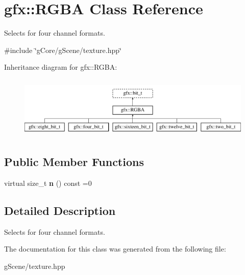 \hypertarget{classgfx_1_1RGBA}{\section{gfx\-:\-:R\-G\-B\-A Class Reference}
\label{classgfx_1_1RGBA}
}


Selects for four channel formats.  




{\ttfamily \#include \char`\"{}g\-Core/g\-Scene/texture.\-hpp\char`\"{}}

Inheritance diagram for gfx\-:\-:R\-G\-B\-A\-:\begin{figure}[H]
\begin{center}
\leavevmode
\includegraphics[height=3.000000cm]{classgfx_1_1RGBA}
\end{center}
\end{figure}
\subsection*{Public Member Functions}
\begin{DoxyCompactItemize}
\item 
\hypertarget{classgfx_1_1RGBA_a0925a6cbcc1eabedb944f880ac3ce9ea}{virtual size\-\_\-t {\bfseries n} () const =0}\label{classgfx_1_1RGBA_a0925a6cbcc1eabedb944f880ac3ce9ea}

\end{DoxyCompactItemize}


\subsection{Detailed Description}
Selects for four channel formats. 

The documentation for this class was generated from the following file\-:\begin{DoxyCompactItemize}
\item 
g\-Scene/texture.\-hpp\end{DoxyCompactItemize}

